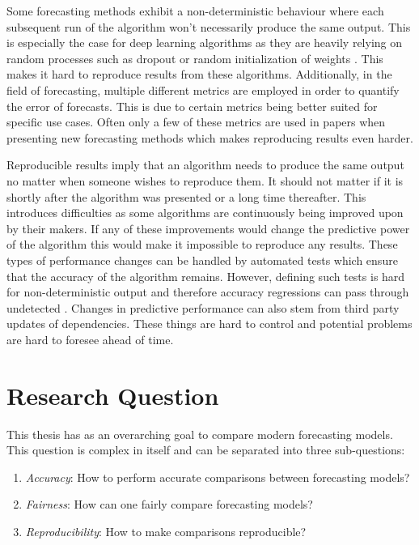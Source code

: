 Some forecasting methods exhibit a non-deterministic behaviour where each subsequent run of the algorithm won’t necessarily produce the same output. This is especially the case for deep learning algorithms as they are heavily relying on random processes such as dropout or random initialization of weights \cite{srivastava_dropout_2014}. This makes it hard to reproduce results from these algorithms. Additionally, in the field of forecasting, multiple different metrics are employed in order to quantify the error of forecasts. This is due to certain metrics being better suited for specific use cases. Often only a few of these metrics are used in papers when presenting new forecasting methods which makes reproducing results even harder.

Reproducible results imply that an algorithm needs to produce the same output no matter when someone wishes to reproduce them. It should not matter if it is shortly after the algorithm was presented or a long time thereafter. This introduces difficulties as some algorithms are continuously being improved upon by their makers. If any of these improvements would change the predictive power of the algorithm this would make it impossible to reproduce any results. These types of performance changes can be handled by automated tests which ensure that the accuracy of the algorithm remains. However, defining such tests is hard for non-deterministic output and therefore accuracy regressions can pass through undetected \cite{gluonts_deepar_github_issue}. Changes in predictive performance can also stem from third party updates of dependencies. These things are hard to control and potential problems are hard to foresee ahead of time.

\section{Research Question}
This thesis has as an overarching goal to compare modern forecasting models. This question is complex in itself and can be separated into three sub-questions:

\begin{enumerate}
  \item \textit{Accuracy}: How to perform accurate comparisons between forecasting models?
  \item \textit{Fairness}: How can one fairly compare forecasting models?
  \item \textit{Reproducibility}: How to make comparisons reproducible?
\end{enumerate}

